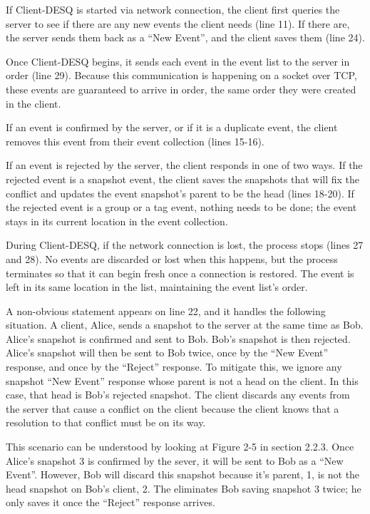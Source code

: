 If Client-DESQ is started via network connection, the client first queries the server to see if there are any new events the client needs (line 11). If there are, the server sends them back as a ``New Event'', and the client saves them (line 24).

Once Client-DESQ begins, it sends each event in the event list to the server in order (line 29). Because this communication is happening on a socket over TCP, these events are guaranteed to arrive in order, the same order they were created in the client.

If an event is confirmed by the server, or if it is a duplicate event, the client removes this event from their event collection (lines 15-16). 

If an event is rejected by the server, the client responds in one of two ways. If the rejected event is a snapshot event, the client saves the snapshots that will fix the conflict and updates the event snapshot's parent to be the head (lines 18-20). If the rejected event is a group or a tag event, nothing needs to be done; the event stays in its current location in the event collection.

During Client-DESQ, if the network connection is lost, the process stops (lines 27 and 28). No events are discarded or lost when this happens, but the process terminates so that it can begin fresh once a connection is restored. The event is left in its same location in the list, maintaining the event list's order.

A non-obvious statement appears on line 22, and it handles the following situation. A client, Alice, sends a snapshot to the server at the same time as Bob. Alice's snapshot is confirmed and sent to Bob. Bob's snapshot is then rejected. Alice's snapshot will then be sent to Bob twice, once by the ``New Event'' response, and once by the ``Reject'' response. To mitigate this, we ignore any snapshot ``New Event'' response whose parent is not a head on the client. In this case, that head is Bob's rejected snapshot. The client discards any events from the server that cause a conflict on the client because the client knows that a resolution to that conflict must be on its way.

This scenario can be understood by looking at Figure 2-5 in section 2.2.3. Once Alice's snapshot 3 is confirmed by the sever, it will be sent to Bob as a ``New Event''. However, Bob will discard this snapshot because it's parent, 1, is not the head snapshot on Bob's client, 2. The eliminates Bob saving snapshot 3 twice; he only saves it once the ``Reject'' response arrives.

